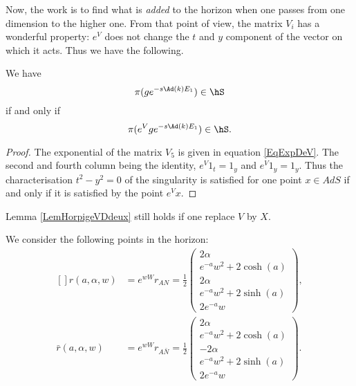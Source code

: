 Now, the work is to find what is \emph{added} to the horizon when one passes from one dimension to the higher one. From that point of view, the matrix $V_i$ has a wonderful property: $ e^{V}$ does not change the $t$ and $y$ component of the vector on which it acts. Thus we have the following.
\begin{lemma}		\label{LemHorpigeVDdeux}
We have
\begin{equation}
	\pi(g e^{-s\Ad(k)E_1})\in\hS
\end{equation}
if and only if
\begin{equation}
	 \pi(e^{V}g e^{-s\Ad(k)E_1})\in\hS.
\end{equation}
\end{lemma}

\begin{proof}
The exponential of the matrix $V_5$ is given in equation \eqref{EqExpDeV}. The second and fourth column being the identity, $e^V1_t=1_y$ and $e^V1_y=1_y$. Thus the characterisation $t^2-y^2=0$ of the singularity is satisfied for one point $x\in AdS$ if and only if it is satisfied by the point $e^Vx$.
\end{proof}

Lemma \ref{LemHorpigeVDdeux} still holds if one replace $V$ by $X$.
	
We consider the following points in the horizon:
\begin{equation}		\label{EqPartewWrAN}
	\begin{aligned}[]
	r(a,\alpha,w)&= e^{wW}r_{AN}=
\frac{ 1 }{2}
\begin{pmatrix}
	2\alpha	\\ 
	e^{-a}w^2+2\cosh(a)\\ 
	2\alpha	\\ 
	e^{-a}w^2+2\sinh(a)	\\ 
	2 e^{-a}w	
\end{pmatrix},\\
	\bar r(a,\alpha,w)&= e^{wW}r_{A\bar N}=
\frac{ 1 }{2}
\begin{pmatrix}
	2\alpha	\\ 
	 e^{-a}w^2+2\cosh(a) \\ 
	-2\alpha	\\ 
	e^{-a}w^2+2\sinh(a)	\\ 
	 2e^{-a}w	
\end{pmatrix}.
	\end{aligned}
\end{equation}

